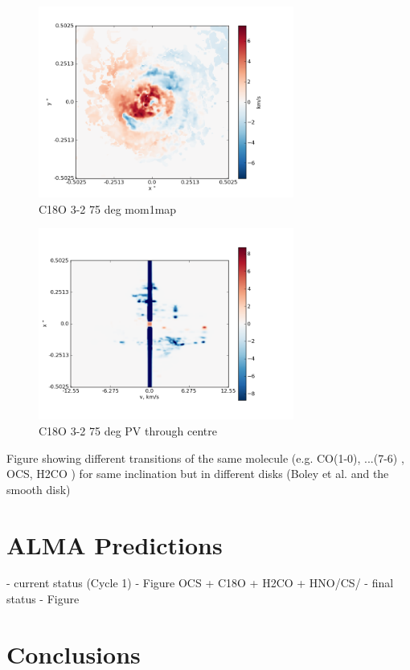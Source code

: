 \documentclass[useAMS,usenatbib]{mn2e}
\begin{document}
\begin{figure}
 \includegraphics[width=84mm]{Figures/sim/imageC18O_3-2_75deg_mom1.png}

 \caption{C18O 3-2 75 deg mom1map}
\end{figure}

\begin{figure}
 \includegraphics[width=84mm]{Figures/sim/imageC18O_3-2_75deg_PV_centre.png}

 \caption{C18O 3-2 75 deg PV through centre}
\end{figure}


Figure showing different transitions of the same molecule (e.g. CO(1-0), ...(7-6) , OCS,  H2CO ) for same inclination but in different disks (Boley et al. and the smooth disk)\newline

\section{ALMA Predictions}

- current status (Cycle 1) - Figure
OCS + C18O + H2CO + HNO/CS/
- final status - Figure 


\section{Conclusions}
\end{document}
